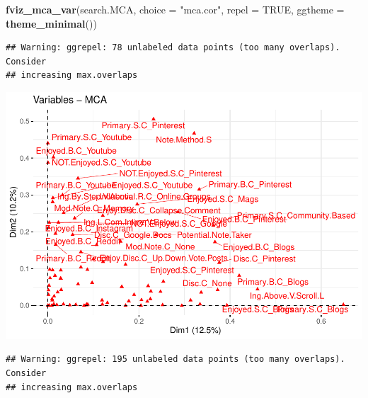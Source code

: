 \documentclass[
]{article}
\newenvironment{Shaded}{\begin{snugshade}}{\end{snugshade}}
\newcommand{\DataTypeTok}[1]{\textcolor[rgb]{0.13,0.29,0.53}{#1}}
\newcommand{\KeywordTok}[1]{\textcolor[rgb]{0.13,0.29,0.53}{\textbf{#1}}}
\newcommand{\NormalTok}[1]{#1}
\newcommand{\OtherTok}[1]{\textcolor[rgb]{0.56,0.35,0.01}{#1}}
\newcommand{\StringTok}[1]{\textcolor[rgb]{0.31,0.60,0.02}{#1}}
\begin{document}
\begin{Shaded}
\begin{Highlighting}[]
\KeywordTok{fviz_mca_var}\NormalTok{(search.MCA, }\DataTypeTok{choice =} \StringTok{"mca.cor"}\NormalTok{, }\DataTypeTok{repel =} \OtherTok{TRUE}\NormalTok{,}
             \DataTypeTok{ggtheme =} \KeywordTok{theme_minimal}\NormalTok{())}
\end{Highlighting}
\end{Shaded}

\begin{verbatim}
## Warning: ggrepel: 78 unlabeled data points (too many overlaps). Consider
## increasing max.overlaps
\end{verbatim}

\includegraphics{Average-User-MCA_files/figure-latex/mca enjoyed all-2.pdf}

\begin{Shaded}
\end{Shaded}

\begin{verbatim}
## Warning: ggrepel: 195 unlabeled data points (too many overlaps). Consider
## increasing max.overlaps
\end{verbatim}
\end{document}
